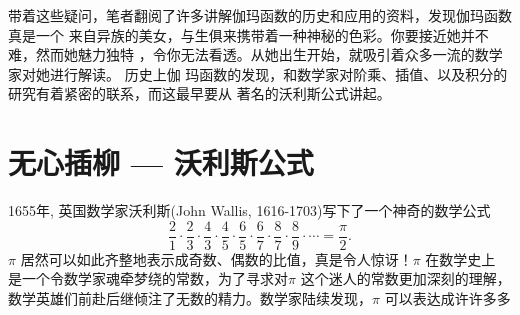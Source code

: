 带着这些疑问，笔者翻阅了许多讲解伽玛函数的历史和应用的资料，发现伽玛函数真是一个
来自异族的美女，与生俱来携带着一种神秘的色彩。你要接近她并不难，然而她魅力独特
，令你无法看透。从她出生开始，就吸引着众多一流的数学家对她进行解读。 历史上伽
玛函数的发现，和数学家对阶乘、插值、以及积分的研究有着紧密的联系，而这最早要从
著名的沃利斯公式讲起。

\section{无心插柳 --- 沃利斯公式}

1655年, 英国数学家沃利斯(John Wallis, 1616-1703)写下了一个神奇的数学公式
\begin{equation}
\label{wallis-formula}
\frac{2}{1} \cdot \frac{2}{3} \cdot \frac{4}{3} \cdot \frac{4}{5} \cdot
\frac{6}{5} \cdot \frac{6}{7} \cdot \frac{8}{7} \cdot \frac{8}{9} \cdot \cdots =
\frac{\pi}{2} .
\end{equation}
$\pi$ 居然可以如此齐整地表示成奇数、偶数的比值，真是令人惊讶！$\pi$ 在数学史上
是一个令数学家魂牵梦绕的常数，为了寻求对$\pi$ 这个迷人的常数更加深刻的理解，
数学英雄们前赴后继倾注了无数的精力。数学家陆续发现，$\pi$ 可以表达成许许多多
